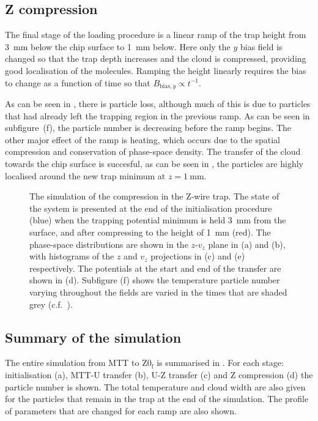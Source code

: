 \subsection{Z compression}

The final stage of the loading procedure is a linear ramp of the trap height
from \SI{3}{\milli\meter} below the chip surface to \SI{1}{\milli\meter} below.
Here only the $y$ bias field is changed so  that the trap depth
increases and the cloud is compressed, providing good localisation of the
molecules. Ramping the height linearly requires the bias to change as a
function of time so that $B_{\text{bias}, y} \propto t^{-1}$.

As can be seen in , there is particle loss,
although much of this is due to particles that had already left the trapping
region in the previous ramp. As can be seen in subfigure~(f), the particle
number is decreasing before the ramp begins. The other major effect of the ramp
is heating, which occurs due to the spatial compression and conservation of
phase-space density.
%
The transfer of the cloud towards the chip surface is succesful, as can be seen
in , the particles are highly localised around the
new trap minimum at $z=\SI{1}{\milli\meter}$.

\begin{figure}[p]
\centering
  \caption{
    The simulation of the compression in the Z-wire trap. The state of the
    system is presented at the end of the initialisation procedure (blue) when
    the trapping potential minimum is held \SI{3}{\milli\meter} from the
    surface, and after compressing to the height of \SI{1}{\milli\meter} (red).
    The phase-space distributions are shown in the $z$-$v_z$ plane in (a) and
    (b), with histograms of the $z$ and $v_z$ projections in (c) and (e)
    respectively. The potentials at the start and end of the transfer are shown
    in (d). Subfigure (f) shows the temperature particle number varying
    throughout the fields are varied in the times that are shaded grey
    (c.f.~).
  }
  \label{sim:fig:zsim}
\end{figure}

\subsection{Summary of the simulation}

The entire simulation from MTT to $\mathrm{Z0_f}$ is summarised in
. For each stage: initialisation (a), MTT-U
transfer (b), U-Z transfer (c) and Z compression (d) the particle number is
shown. The total temperature and cloud width are also given for the particles
that remain in the trap at the end of the simulation. The profile of parameters
that are changed for each ramp are also shown. 


